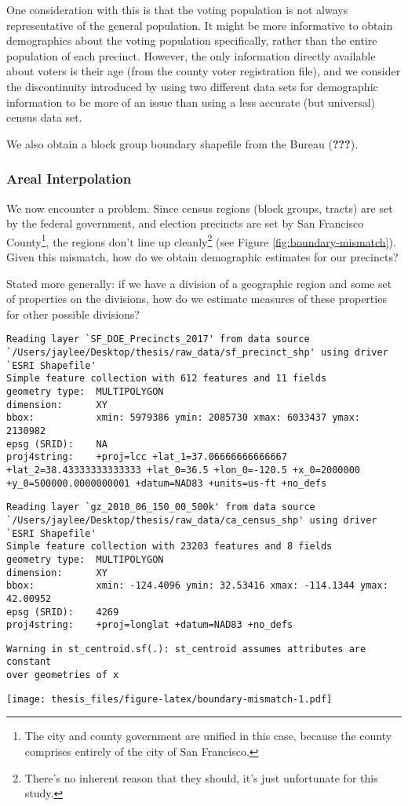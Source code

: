 \documentclass[12pt,twoside]{reedthesis}
\begin{document}
One consideration with this is that the voting population is not always representative of the general population. It might be more informative to obtain demographics about the voting population specifically, rather than the entire population of each precinct. However, the only information directly available about voters is their age (from the county voter registration file), and we consider the discontinuity introduced by using two different data sets for demographic information to be more of an issue than using a less accurate (but universal) census data set.

We also obtain a block group boundary shapefile from the Bureau ({\textbf{???}}).

\hypertarget{areal-interpolation}{%
\subsubsection{Areal Interpolation}\label{areal-interpolation}}

We now encounter a problem. Since census regions (block groups, tracts) are set by the federal government, and election precincts are set by San Francisco County\footnote{The city and county government are unified in this case, because the county comprises entirely of the city of San Francisco.}, the regions don't line up cleanly\footnote{There's no inherent reason that they should, it's just unfortunate for this study.} (see Figure \ref{fig:boundary-mismatch}). Given this mismatch, how do we obtain demographic estimates for our precincts?

Stated more generally: if we have a division of a geographic region and some set of properties on the divisions, how do we estimate measures of these properties for other possible divisions?
\begin{verbatim}
Reading layer `SF_DOE_Precincts_2017' from data source `/Users/jaylee/Desktop/thesis/raw_data/sf_precinct_shp' using driver `ESRI Shapefile'
Simple feature collection with 612 features and 11 fields
geometry type:  MULTIPOLYGON
dimension:      XY
bbox:           xmin: 5979386 ymin: 2085730 xmax: 6033437 ymax: 2130982
epsg (SRID):    NA
proj4string:    +proj=lcc +lat_1=37.06666666666667 +lat_2=38.43333333333333 +lat_0=36.5 +lon_0=-120.5 +x_0=2000000 +y_0=500000.0000000001 +datum=NAD83 +units=us-ft +no_defs
\end{verbatim}
\begin{verbatim}
Reading layer `gz_2010_06_150_00_500k' from data source `/Users/jaylee/Desktop/thesis/raw_data/ca_census_shp' using driver `ESRI Shapefile'
Simple feature collection with 23203 features and 8 fields
geometry type:  MULTIPOLYGON
dimension:      XY
bbox:           xmin: -124.4096 ymin: 32.53416 xmax: -114.1344 ymax: 42.00952
epsg (SRID):    4269
proj4string:    +proj=longlat +datum=NAD83 +no_defs
\end{verbatim}
\begin{verbatim}
Warning in st_centroid.sf(.): st_centroid assumes attributes are constant
over geometries of x
\end{verbatim}
\texttt{[image: thesis\_files/figure-latex/boundary-mismatch-1.pdf]}
\end{document}
